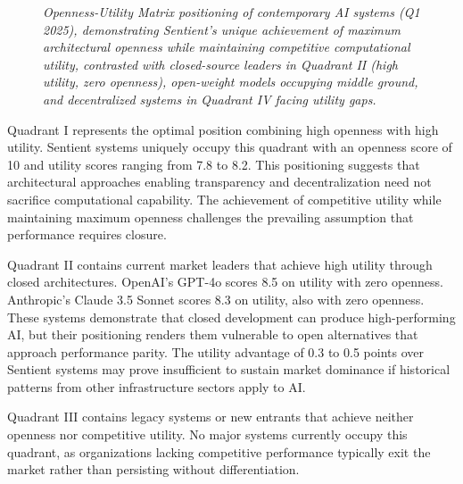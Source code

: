 \begin{figure}[h]
\caption{\textit{Openness-Utility Matrix positioning of contemporary AI systems (Q1 2025), demonstrating Sentient's unique achievement of maximum architectural openness while maintaining competitive computational utility, contrasted with closed-source leaders in Quadrant II (high utility, zero openness), open-weight models occupying middle ground, and decentralized systems in Quadrant IV facing utility gaps.}}
\label{fig:openness_utility_matrix}
\end{figure}


Quadrant I represents the optimal position combining high openness with high utility. Sentient systems uniquely occupy this quadrant with an openness score of 10 and utility scores ranging from 7.8 to 8.2. This positioning suggests that architectural approaches enabling transparency and decentralization need not sacrifice computational capability. The achievement of competitive utility while maintaining maximum openness challenges the prevailing assumption that performance requires closure.

Quadrant II contains current market leaders that achieve high utility through closed architectures. OpenAI's GPT-4o scores 8.5 on utility with zero openness. Anthropic's Claude 3.5 Sonnet scores 8.3 on utility, also with zero openness. These systems demonstrate that closed development can produce high-performing AI, but their positioning renders them vulnerable to open alternatives that approach performance parity. The utility advantage of 0.3 to 0.5 points over Sentient systems may prove insufficient to sustain market dominance if historical patterns from other infrastructure sectors apply to AI.

Quadrant III contains legacy systems or new entrants that achieve neither openness nor competitive utility. No major systems currently occupy this quadrant, as organizations lacking competitive performance typically exit the market rather than persisting without differentiation.


